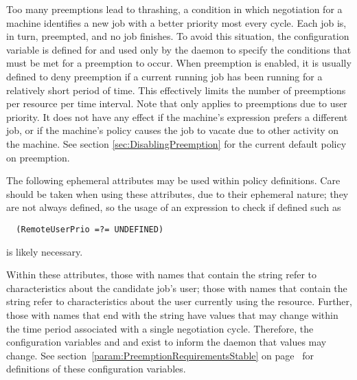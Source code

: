 Too many preemptions lead to thrashing,
a condition in which negotiation for a machine identifies a
new job with a better priority most every cycle.
Each job is, in turn, preempted, and no job finishes.
To avoid this situation, the  
configuration variable is defined for and used only by 
the  daemon
to specify the conditions that must be met for a preemption to
occur.  When preemption is enabled,
it is usually defined to deny preemption if a current running
job has been running for a relatively short period of time.  This
effectively limits the number of preemptions per resource per time
interval.
Note that  only applies to preemptions
due to user priority.  It does not have any effect if the machine's 
expression prefers a different job, or if the machine's policy
causes the job to vacate due to other activity on the machine.
See section \ref{sec:DisablingPreemption} for the current default
policy on preemption.

The following ephemeral attributes may be used within policy definitions.
Care should be taken when using these attributes, 
due to their ephemeral nature;
they are not always defined, so the usage of an expression to 
check if defined such as
\begin{verbatim}
  (RemoteUserPrio =?= UNDEFINED)
\end{verbatim}
is likely necessary.

Within these attributes, those with names that contain the
string  refer to characteristics about the candidate job's user;
those with names that contain the string 
refer to characteristics about the user currently using the resource.
Further,  those with names that end with the
string  have values that may change within
the time period associated with a single negotiation cycle.
Therefore, the configuration variables 
and and  exist to inform the 
 daemon that values may change.
See section~\ref{param:PreemptionRequirementsStable} on
page~\pageref{param:PreemptionRequirementsStable} for
definitions of these configuration variables.

